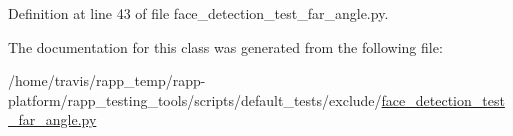 Definition at line 43 of file face\-\_\-detection\-\_\-test\-\_\-far\-\_\-angle.\-py.



The documentation for this class was generated from the following file\-:\begin{DoxyCompactItemize}
\item 
/home/travis/rapp\-\_\-temp/rapp-\/platform/rapp\-\_\-testing\-\_\-tools/scripts/default\-\_\-tests/exclude/\hyperlink{face__detection__test__far__angle_8py}{face\-\_\-detection\-\_\-test\-\_\-far\-\_\-angle.\-py}\end{DoxyCompactItemize}
